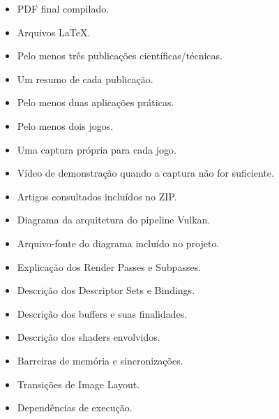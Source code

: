 \documentclass[12pt,a4paper]{report}
\begin{document}
\begin{itemize}

    \item[$\square$] PDF final compilado.

    \item[$\square$] Arquivos \LaTeX{}.

    \item[$\square$] Pelo menos três publicações científicas/técnicas.

    \item[$\square$] Um resumo de cada publicação.

    \item[$\square$] Pelo menos duas aplicações práticas.

    \item[$\square$] Pelo menos dois jogos.

    \item[$\square$] Uma captura própria para cada jogo.

    \item[$\square$] Vídeo de demonstração quando a captura não for suficiente.

    \item[$\square$] Artigos consultados incluídos no ZIP.

    \item[$\square$] Diagrama da arquitetura do pipeline Vulkan.

    \item[$\square$] Arquivo-fonte do diagrama incluído no projeto.

    \item[$\square$] Explicação dos Render Passes e Subpasses.

    \item[$\square$] Descrição dos Descriptor Sets e Bindings.

    \item[$\square$] Descrição dos buffers e suas finalidades.

    \item[$\square$] Descrição dos shaders envolvidos.

    \item[$\square$] Barreiras de memória e sincronizações.

    \item[$\square$] Transições de Image Layout.

    \item[$\square$] Dependências de execução.

\end{itemize}
\end{document}
